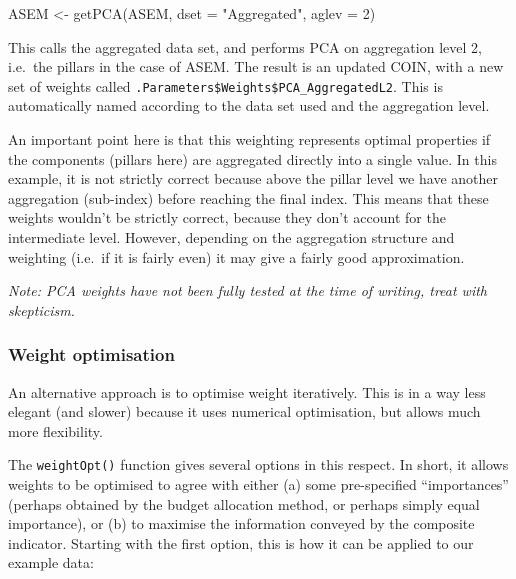 \documentclass[
]{book}
\newenvironment{Shaded}{\begin{snugshade}}{\end{snugshade}}
\newcommand{\AttributeTok}[1]{\textcolor[rgb]{0.77,0.63,0.00}{#1}}
\newcommand{\DecValTok}[1]{\textcolor[rgb]{0.00,0.00,0.81}{#1}}
\newcommand{\FunctionTok}[1]{\textcolor[rgb]{0.00,0.00,0.00}{#1}}
\newcommand{\NormalTok}[1]{#1}
\newcommand{\OtherTok}[1]{\textcolor[rgb]{0.56,0.35,0.01}{#1}}
\newcommand{\StringTok}[1]{\textcolor[rgb]{0.31,0.60,0.02}{#1}}
\begin{document}
\begin{Shaded}
\begin{Highlighting}[]
\NormalTok{ASEM }\OtherTok{\textless{}{-}} \FunctionTok{getPCA}\NormalTok{(ASEM, }\AttributeTok{dset =} \StringTok{"Aggregated"}\NormalTok{, }\AttributeTok{aglev =} \DecValTok{2}\NormalTok{)}
\end{Highlighting}
\end{Shaded}

This calls the aggregated data set, and performs PCA on aggregation level 2, i.e.~the pillars in the case of ASEM. The result is an updated COIN, with a new set of weights called \texttt{.Parameters\$Weights\$PCA\_AggregatedL2}. This is automatically named according to the data set used and the aggregation level.

An important point here is that this weighting represents optimal properties if the components (pillars here) are aggregated directly into a single value. In this example, it is not strictly correct because above the pillar level we have another aggregation (sub-index) before reaching the final index. This means that these weights wouldn't be strictly correct, because they don't account for the intermediate level. However, depending on the aggregation structure and weighting (i.e.~if it is fairly even) it may give a fairly good approximation.

\emph{Note: PCA weights have not been fully tested at the time of writing, treat with skepticism.}

\hypertarget{weight-optimisation-1}{%
\subsubsection{Weight optimisation}\label{weight-optimisation-1}}

An alternative approach is to optimise weight iteratively. This is in a way less elegant (and slower) because it uses numerical optimisation, but allows much more flexibility.

The \texttt{weightOpt()} function gives several options in this respect. In short, it allows weights to be optimised to agree with either (a) some pre-specified ``importances'' (perhaps obtained by the budget allocation method, or perhaps simply equal importance), or (b) to maximise the information conveyed by the composite indicator. Starting with the first option, this is how it can be applied to our example data:
\end{document}
